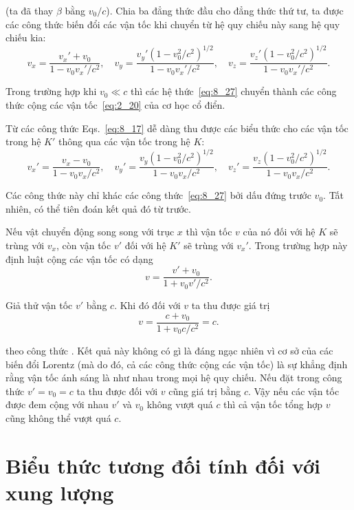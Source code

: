 \noindent
(ta đã thay $\beta$ bằng $v_0/c$). Chia ba đẳng thức đầu cho đẳng thức thứ tư, ta được các công thức biến đổi các vận tốc khi chuyển từ hệ quy chiếu này sang hệ quy chiếu kia:
\begin{equation}\label{eq:8_27}
	v_x = \frac{v_x'+v_0}{1 - v_0v_x'/c^2},\quad  v_y = \frac{v_y'\left(1-v_0^2/c^2\right)^{1/2}}{1 - v_0v_x'/c^2},\quad v_z = \frac{v_z'\left(1-v_0^2/c^2\right)^{1/2}}{1 - v_0v_x'/c^2}.
\end{equation}

\noindent
Trong trường hợp khi $v_0\ll c$ thì các hệ thức~\eqref{eq:8_27} chuyển thành các công thức cộng các vận tốc~\eqref{eq:2_20} của cơ học cổ điển.

Từ các công thức Eqs.~\eqref{eq:8_17} dễ dàng thu được các biểu thức cho các vận tốc trong hệ $K'$ thông qua các vận tốc trong hệ $K$:
\begin{equation}\label{eq:8_28}
	v_x' = \frac{v_x-v_0}{1 - v_0v_x/c^2},\quad  v_y' = \frac{v_y\left(1-v_0^2/c^2\right)^{1/2}}{1 - v_0v_x/c^2},\quad v_z' = \frac{v_z\left(1-v_0^2/c^2\right)^{1/2}}{1 - v_0v_x/c^2}.
\end{equation}

\noindent
Các công thức này chỉ khác các công thức~\eqref{eq:8_27} bởi dấu đứng trước $v_0$. Tất nhiên, có thể tiên đoán kết quả đó từ trước.

Nếu vật chuyển động song song với trục $x$ thì vận tốc $v$ của nó đối với hệ $K$ sẽ trùng với $v_x$, còn vận tốc $v'$ đối với hệ $K'$ sẽ trùng với $v_x'$. Trong trường hợp này định luật cộng các vận tốc có dạng
\begin{equation}\label{eq:8_29}
	v = \frac{v' + v_0}{1 + v_0 v'/c^2}.
\end{equation}

\noindent
Giả thử vận tốc $v'$ bằng $c$. Khi đó đối với $v$ ta thu được giá trị
\begin{equation*}
	v = \frac{c + v_0}{1 + v_0 c/c^2} = c.
\end{equation*}

\noindent
theo công thức . Kết quả này không có gì là đáng ngạc nhiên vì cơ sở của các biến đổi Lorentz (mà do đó, cả các công thức cộng các vận tốc) là sự khẳng định rằng vận tốc ánh sáng là như nhau trong mọi hệ quy chiếu. Nếu đặt trong công thức  $v'=v_0=c$ ta thu được đối với $v$ cũng giá trị bằng $c$. Vậy nếu các vận tốc được đem cộng với nhau $v'$ và $v_0$ không vượt quá $c$ thì cả vận tốc tổng hợp $v$ cũng không thể vượt quá $c$.

\section{Biểu thức tương đối tính đối với xung lượng}\label{sec:8_6}

